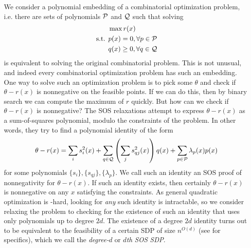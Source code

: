 We consider a polynomial embedding of a combinatorial optimization problem, i.e. there are sets of polynomials $\mathcal P$ and $\mathcal Q$ such that solving
\begin{align*}
&\max r(x) \\
\text{s.t. } &p(x) = 0, \forall p \in \mathcal P \\
&q(x) \geq 0, \forall q \in \mathcal Q
\end{align*}
is equivalent to solving the original combinatorial problem. This is not unusual, and indeed every combinatorial optimization problem has such an embedding. One way to solve such an optimization problem is to pick some $\theta$ and check if $\theta - r(x)$ is nonnegative on the feasible points. If we can do this, then by binary search we can compute the maximum of $r$ quickly. But how can we check if $\theta - r(x)$ is nonnegative? The SOS relaxations attempt to express $\theta - r(x)$ as a sum-of-squares polynomial, modulo the constraints of the problem. In other words, they try to find a polynomial identity of the form
\[\theta - r(x) = \sum_i s_i^2(x) + \sum_{q \in \mathcal Q} \left(\sum_j s_{qj}^2(x)\right)q(x) + \sum_{p\in\mathcal P} \lambda_p(x)p(x)\label{eq:intro_sos_proof}\]
for some polynomials $\{s_i\}, \{s_{qj}\}, \{\lambda_p\}$.
We call such an identity an SOS proof of nonnegativity for $\theta - r(x)$.
If such an identity exists, then certainly $\theta - r(x)$ is nonnegative on any $x$ satisfying the constraints. As general quadratic optimization is \np-hard, looking for \emph{any} such identity is intractable, so we consider relaxing the problem to checking for the existence of such an identity that uses only polynomials up to degree $2d$. The existence of a degree $2d$ identity turns out to be equivalent to the feasibility of a certain SDP of size $n^{O(d)}$ (see  for specifics), which we call the \emph{degree-$d$} or \emph{$d$th SOS SDP}.

